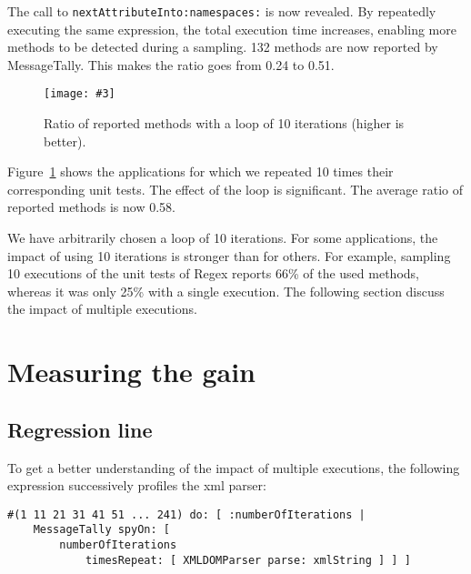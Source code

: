 \documentclass{sig-alternate}
\newcommand{\ct}{\lstinline[backgroundcolor=\color{white},basicstyle=\footnotesize\ttfamily]}
\newcommand{\fig}[4]{
	\begin{figure}[#1]
		\centering
		\texttt{[image: \#3]}
		\caption{\label{fig:#3}#4}
	\end{figure}}
\newcommand{\seclabel}[1]{\label{sec:#1}}
\newcommand{\figref}[1]{Figure~\ref{fig:#1}}
\begin{document}
The call to \ct{nextAttributeInto:namespaces:} is now revealed. By repeatedly executing the same expression, the total execution time increases, enabling more methods to be detected during a sampling. 132 methods are now reported by MessageTally. This makes the ratio goes from 0.24 to 0.51.



\fig{h}{0.5}{RatioAfter10Loops}{Ratio of reported methods with a loop of 10 iterations (higher is better).}

\figref{RatioAfter10Loops} shows the applications for which we repeated 10 times their corresponding unit tests. The effect of the loop is significant. The average ratio of reported methods is now 0.58. 

We have arbitrarily chosen a loop of 10 iterations. For some applications, the impact of using 10 iterations is stronger than for others. For example, sampling 10 executions of the unit tests of Regex reports 66\% of the used methods, whereas it was only 25\% with a single execution. The following section discuss the impact of multiple executions.

\section{Measuring the gain} \seclabel{measuringTheGain}
 
\subsection{Regression line}

To get a better understanding of the impact of multiple executions, the following expression successively profiles the xml parser:

\begin{lstlisting}
#(1 11 21 31 41 51 ... 241) do: [ :numberOfIterations |
	MessageTally spyOn: [  
		numberOfIterations 
			timesRepeat: [ XMLDOMParser parse: xmlString ] ] ]
\end{lstlisting}
\end{document}
